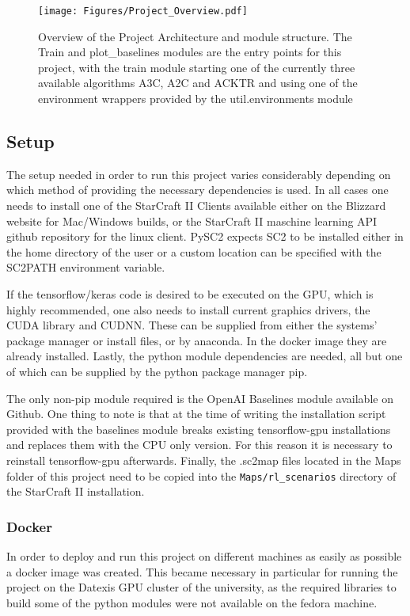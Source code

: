 \begin{figure}[htb]
  \centering
      \texttt{[image: Figures/Project\_Overview.pdf]}
  \caption{ Overview of the Project Architecture and module structure. The Train and plot\_baselines modules are the entry points for this project, with the train module starting one of the currently three available algorithms A3C, A2C and ACKTR and using one of the environment wrappers provided by the util.environments module}
  \label{fig:proj}
\end{figure}



\subsection{Setup}

The setup needed in order to run this project varies considerably depending on which method of providing the necessary dependencies is used. In all cases one needs to install one of the StarCraft II Clients available either on the Blizzard website for Mac/Windows builds, or the StarCraft II maschine learning API github repository for the linux client. PySC2 expects SC2 to be installed either in the home directory of the user or a custom location can be specified with the SC2PATH environment variable. 

If the tensorflow/keras code is desired to be executed on the GPU, which is highly recommended, one also needs to install current graphics drivers, the CUDA library and CUDNN. These can be supplied from either the systems' package manager or install files, or by anaconda. In the docker image they are already installed. Lastly, the python module dependencies are needed, all but one of which can be supplied by the python package manager pip.

The only non-pip module required is the OpenAI Baselines module available on Github. One thing to note is that at the time of writing the installation script provided with the baselines module breaks existing tensorflow-gpu installations and replaces them with the CPU only version. For this reason it is necessary to reinstall tensorflow-gpu afterwards. Finally, the .sc2map files located in the Maps folder of this project need to be copied into the \lstinline{Maps/rl_scenarios} directory of the StarCraft II installation.


\subsubsection{Docker}
\label{sec:docker}
In order to deploy and run this project on different machines as easily as possible a docker image was created. This became necessary in particular for running the project on the Datexis GPU cluster of the university, as the required libraries to build some of the python modules were not available on the fedora machine.

